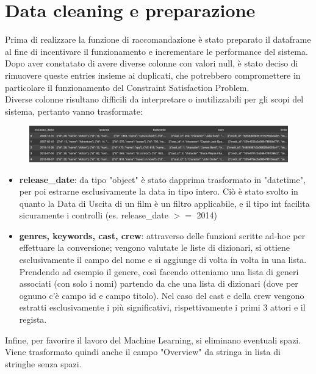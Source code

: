 \documentclass{report}
\begin{document}
    \section{Data cleaning e preparazione}
        Prima di realizzare la funzione di raccomandazione è stato preparato il dataframe al fine di incentivare il funzionamento e incrementare le performance del sistema. \\ Dopo aver constatato di avere diverse colonne con valori null, è stato deciso di rimuovere queste entries insieme ai duplicati, che potrebbero compromettere in particolare il funzionamento del Constraint Satisfaction Problem. \\
        Diverse colonne risultano difficili da interpretare o inutilizzabili per gli scopi del sistema, pertanto vanno trasformate:
        \begin{figure}[h]
            \centering
            \includegraphics[width=1\linewidth]{screenshot/convert_features.png}
        \end{figure}
        \begin{itemize}
            \item \textbf{release\_date}: da tipo "object" è stato dapprima trasformato in "datetime", per poi estrarne esclusivamente la data in tipo intero. Ciò è stato svolto in quanto la Data di Uscita di un film è un filtro applicabile, e il tipo int facilita sicuramente i controlli (es. release\_date $>=$ 2014)
            \item \textbf{genres, keywords, cast, crew}: attraverso delle funzioni scritte ad-hoc per effettuare la conversione; vengono valutate le liste di dizionari, si ottiene esclusivamente il campo del nome e si aggiunge di volta in volta in una lista. Prendendo ad esempio il genere, così facendo otteniamo una lista di generi associati (con solo i nomi) partendo da che una lista di dizionari (dove per ognuno c'è campo id e campo titolo). Nel caso del cast e della crew vengono estratti esclusivamente i più significativi, rispettivamente i primi 3 attori e il regista.
        \end{itemize}
        Infine, per favorire il lavoro del Machine Learning, si eliminano eventuali spazi. Viene trasformato quindi anche il campo "Overview" da stringa in lista di stringhe senza spazi. \\
\end{document}
